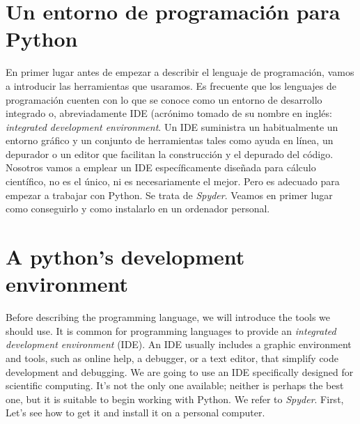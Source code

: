 \begin{paracol}{2}
\section[Un entorno de programación para Python]{Un entorno de programación para Python}
En primer lugar antes de empezar a describir el lenguaje de programación, vamos a introducir las herramientas  que usaramos. Es frecuente que los lenguajes de programación cuenten con lo que se conoce como un entorno de desarrollo integrado o, abreviadamente IDE (acrónimo tomado de su nombre en inglés: \emph{integrated development environment}. Un IDE suministra un habitualmente un entorno gráfico y un conjunto de herramientas tales como ayuda en línea, un depurador o un editor que facilitan la construcción y el depurado del código. Nosotros vamos a emplear un IDE específicamente diseñada para cálculo científico, no es el único, ni es necesariamente el mejor. Pero es adecuado para empezar a trabajar con Python. Se trata de \emph{Spyder}. Veamos en primer lugar como conseguirlo y como instalarlo en un ordenador personal.

\switchcolumn
\section{A python's development environment}
Before describing the programming language, we will introduce the tools we should use. It is common for programming languages to provide an \emph{integrated development environment} (IDE). An IDE usually includes a graphic environment and tools, such as online help,  a debugger, or a text editor, that simplify code development and debugging. We are going to use an IDE specifically designed for scientific computing. It's not the only one available; neither is perhaps the best one, but it is suitable to begin working with Python. We refer to \emph{Spyder}. First, Let's see how to get it and install it on a personal computer.
\end{paracol}
